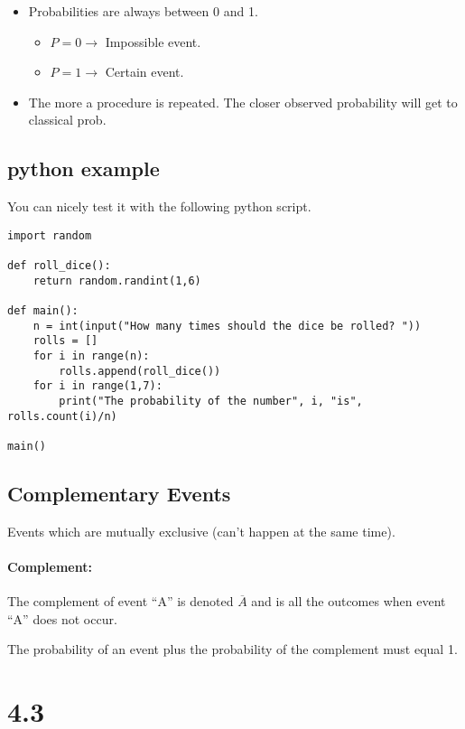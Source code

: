 \documentclass{book}
\begin{document}


\begin{itemize}
    \item Probabilities are always between 0 and 1.
        \begin{itemize}
            \item $P=0 \to$ Impossible event.
            \item $P=1 \to$ Certain event.
        \end{itemize}
    \item The more a procedure is repeated. The closer observed probability will get to classical prob.
\end{itemize}

\subsection{python example}
You can nicely test it with the following python script.
\begin{verbatim}
import random

def roll_dice():
    return random.randint(1,6)

def main():
    n = int(input("How many times should the dice be rolled? "))
    rolls = []
    for i in range(n):
        rolls.append(roll_dice())
    for i in range(1,7):
        print("The probability of the number", i, "is", rolls.count(i)/n)

main()
\end{verbatim}

\subsection{Complementary Events}
Events which are mutually exclusive (can't happen at the same time).

\paragraph{Complement:} The complement of event ``A'' is denoted $\overline{A}$
and is all the outcomes when event ``A'' does not occur.

The probability of an event plus the probability of the complement must equal 1.


\section{4.3}
\end{document}
